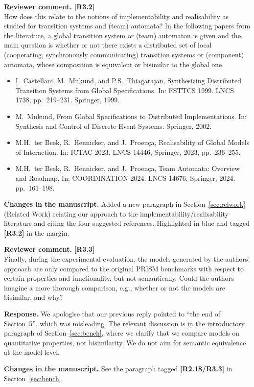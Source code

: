 \documentclass[11pt]{article}
\newcommand{\revcomment}[1]{%
  \begin{reviewercomment}
  \textbf{Reviewer comment.} #1
  \end{reviewercomment}
}
\newcommand{\revresponse}[2][]{%
  \par\noindent\textbf{Response.} #1 #2
}
\newcommand{\revchanges}[2][]{%
  \par\noindent\textbf{Changes in the manuscript.} #1
  #2\par\bigskip
}
\begin{document}
\revcomment{\textbf{[R3.2]}\\
How does this relate to the notions of implementability and
realisability as studied for transition systems and (team) automata?
In the following papers from the literature, a global transition
system or (team) automaton is given and the main question is whether
or not there exists a distributed set of local (cooperating,
synchronously communicating) transition systems or (component)
automata, whose composition is equivalent or bisimilar to the global
one.
\begin{itemize}
\item I.~Castellani, M.~Mukund, and P.S.~Thiagarajan, Synthesizing
  Distributed Transition Systems from Global Specifications. In:
  FSTTCS 1999. LNCS 1738, pp.~219--231. Springer, 1999.
\item M.~Mukund, From Global Specifications to Distributed
  Implementations. In: Synthesis and Control of Discrete Event
  Systems. Springer, 2002.
\item M.H.~ter Beek, R.~Hennicker, and J.~Proen\c{c}a, Realisability
  of Global Models of Interaction. In: ICTAC 2023. LNCS 14446,
  Springer, 2023, pp.~236--255.
\item M.H.~ter Beek, R.~Hennicker, and J.~Proen\c{c}a, Team Automata:
  Overview and Roadmap. In: COORDINATION 2024. LNCS 14676, Springer,
  2024, pp.~161--198.
\end{itemize}
}

\revchanges{ Added a new paragraph in Section~\ref{sec:relwork}
  (Related Work) relating our approach to the
  implementability/realisability literature and citing the four
  suggested references. Highlighted in blue and tagged
  \textbf{[R3.2]} in the margin.}

\revcomment{\textbf{[R3.3]}\\
Finally, during the experimental evaluation, the models generated
by the authors' approach are only compared to the original PRISM
benchmarks with respect to certain properties and functionality,
but not semantically. Could the authors imagine a more thorough
comparison, e.g., whether or not the models are bisimilar, and why?
}

\revresponse{ We apologise that our previous reply pointed to
  ``the end of Section~5'', which was misleading. The relevant
  discussion is in the introductory paragraph of
  Section~\ref{sec:bench}, where we clarify that we compare models
  on quantitative properties, not bisimilarity. We do not aim for
  semantic equivalence at the model level.}

\revchanges{ See the paragraph tagged \textbf{[R2.18/R3.3]} in
  Section~\ref{sec:bench}.}
\end{document}
